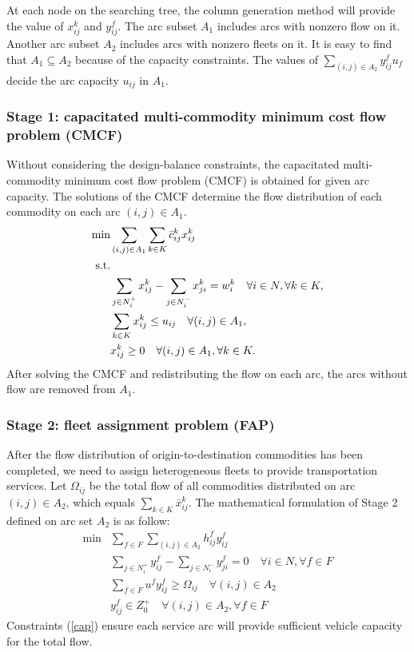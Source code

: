 \documentclass[11pt,nonblindrev,fleqn]{article}
\begin{document}
At each node on the searching tree, the column generation method will provide the value of $x_{ij}^k$ and $y_{ij}^f$. The arc subset $A_1$ includes arcs with nonzero flow on it. Another arc subset $A_2$ includes arcs with nonzero fleets on it. It is easy to find that $A_1\subseteq A_2$ because of the capacity constraints. The values of $\sum_{(i,j)\in A_2}y_{ij}^f u_f$ decide the arc capacity $u_{ij}$ in $A_1$.

\subsubsection{Stage 1: capacitated multi-commodity minimum cost flow problem (CMCF)}
Without considering the design-balance constraints, the capacitated multi-commodity minimum cost flow problem (CMCF) is obtained for given arc capacity. The solutions of the CMCF  determine the flow distribution of each commodity on each arc $(i,j)\in A_1$.
\begin{align}
   \min& \sum_{(i,j)\in A_1}\sum_{k\in K} \bar{c}_{ij}^k x_{ij}^k     \\
   \rm{s.t.} & \nonumber \\
         &  \sum_{j\in N_i^+}x_{ij}^k - \sum_{j\in N_i^-}x_{ji}^k = w_i^k     \quad      \forall i\in N, \forall k\in K,  \\
         &  \sum_{k\in K} x_{ij}^k \leq u_{ij}      \quad    \forall (i,j)\in A_1,  \\
        &  x_{ij}^k \geq 0   \quad    \forall (i,j)\in A_1, \forall k\in K.
\end{align}
After solving the CMCF and redistributing the flow on each arc, the arcs without flow are removed from $A_1$.

\subsubsection{Stage 2: fleet assignment problem (FAP)}
After the flow distribution of origin-to-destination commodities has been completed, we need to assign heterogeneous fleets to provide transportation services. Let $\Omega_{ij}$ be the total flow of all commodities distributed on arc $(i,j) \in A_2$, which equals $\sum_{k\in K}\bar{x}_{ij}^k$. The mathematical formulation of Stage 2 defined on arc set $A_2$ is as follow:
\begin{align}
  \min & \sum_{f\in F}\sum_{(i,j)\in A_2} h_{ij}^f y_{ij}^f \\
     & \sum_{j\in N_i^+}y_{ij}^f - \sum_{j\in N_i^-}y_{ji}^f = 0     \quad      \forall i\in N,\forall f\in F  \\
     & \sum_{f\in F} u^f y_{ij}^f \geq \Omega_{ij}      \quad       \forall (i,j)\in A_2   \label{cap} \\
     & y_{ij}^f \in Z_0^+       \quad       \forall (i,j)\in A_2, \forall f\in F
\end{align}
Constraints (\ref{cap}) ensure each service arc will provide sufficient vehicle capacity for the total flow.
\end{document}
